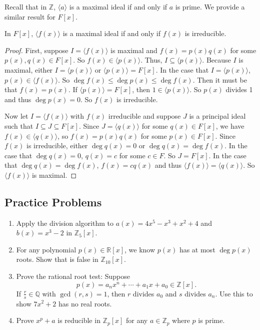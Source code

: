Recall that in $\mathbb Z$, $\langle a\rangle$ is a maximal ideal if and only if $a$ is prime. We provide a similar result for $F[x]$.

\begin{theorem}
	In $F[x]$, $\langle f(x)\rangle$ is a maximal ideal if and only if $f(x)$ is irreducible.
\end{theorem}

\begin{proof}
	First, suppose $I=\langle f(x)\rangle$ is maximal and $f(x)=p(x)q(x)$ for some $p(x),q(x)\in F[x]$. So $f(x)\in\langle p(x)\rangle$. Thus, $I\subseteq\langle p(x)\rangle$. Because $I$ is maximal, either $I=\langle p(x)\rangle$ or $\langle p(x)\rangle= F[x]$. In the case that $I=\langle p(x)\rangle$, $p(x)\in\langle f(x)\rangle$. So $\deg f(x)\leq\deg p(x)\leq\deg f(x)$. Then it must be that $f(x)=p(x)$. If $\langle p(x)\rangle =F[x]$, then $1\in\langle p(x)\rangle$. So $p(x)$ divides 1 and thus $\deg p(x)=0$. So $f(x)$ is irreducible.

	Now let $I=\langle f(x)\rangle$ with $f(x)$ irreducible and suppose $J$ is a principal ideal such that $I\subseteq J\subseteq F[x]$. Since $J=\langle q(x)\rangle$ for some $q(x)\in F[x]$, we have $f(x)\in\langle q(x)\rangle$, so $f(x)=p(x)q(x)$ for some $p(x)\in F[x]$. Since $f(x)$ is irreducible, either $\deg q(x)=0$ or $\deg q(x)=\deg f(x)$. In the case that $\deg q(x)=0$, $q(x)=c$ for some $c\in F$. So $J=F[x]$. In the case that $\deg q(x)=\deg f(x)$, $f(x)=cq(x)$ and thus $\langle f(x)\rangle=\langle q(x)\rangle$. So $\langle f(x)\rangle$ is maximal.
\end{proof}

\subsection*{Practice Problems}

\begin{enumerate}[label={\sffamily\bfseries\color{main}\Alph*.}]
	\item Apply the division algorithm to $a(x)=4x^5-x^3+x^2+4$ and $b(x)=x^3-2$ in $\mathbb Z_5[x]$.
	\item For any polynomial $p(x)\in\mathbb R[x]$, we know $p(x)$ has at most $\deg p(x)$ roots. Show that is false in $\mathbb Z_{10}[x]$.
	\item Prove the rational root test: Suppose
	$$p(x)=a_nx^n+\cdots +a_1x+a_0\in\mathbb Z[x].$$
	If $\frac rs\in\mathbb Q$ with $\gcd(r,s)=1$, then $r$ divides $a_0$ and $s$ divides $a_n$. Use this to show $7x^2+2$ has no real roots.
	\item Prove $x^p+a$ is reducible in $\mathbb Z_p[x]$ for any $a\in\mathbb Z_p$ where $p$ is prime.
\end{enumerate}